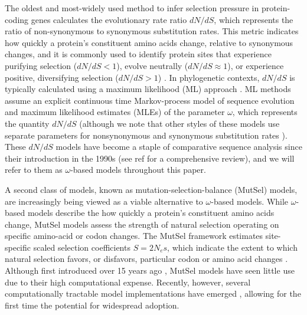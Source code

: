 \documentclass[11pt]{article}
\begin{document}
The oldest and most-widely used method to infer selection pressure in protein-coding genes calculates the evolutionary rate ratio $dN/dS$, which represents the ratio of non-synonymous to synonymous substitution rates. This metric indicates how quickly a protein's constituent amino acids change, relative to synonymous changes, and it is commonly used to identify protein sites that experience purifying selection ($dN/dS<1$), evolve neutrally ($dN/dS\approx1$), or experience positive, diversifying selection ($dN/dS>1$) \cite{NielsenYang1998, Yangetal2000, KosakovskyPondFrost2005b, Huelsenbecketal2006}. In phylogenetic contexts, $dN/dS$ is typically calculated using a maximum likelihood (ML) approach \cite{GoldmanYang1994,MuseGaut1994,NielsenYang1998,Yang2006}. ML methods assume an explicit continuous time Markov-process model of sequence evolution and maximum likelihood estimates (MLEs) of the parameter $\omega$, which represents the quantity $dN/dS$ (although we note that other styles of these models use separate parameters for nonsynonymous and synonymous substitution rates \cite{MuseGaut1994,KosakovskyPondMuse2005}). These $dN/dS$ models have become a staple of comparative sequence analysis since their introduction in the 1990s (see ref \cite{Anisimova2009} for a comprehensive review), and we will refer to them as $\omega$-based models throughout this paper.

A second class of models, known as mutation-selection-balance (MutSel) models, are increasingly being viewed as a viable alternative to $\omega$-based models. While $\omega$-based models describe the how quickly a protein's constituent amino acids change, MutSel models assess the strength of natural selection operating on specific amino-acid or codon changes. The MutSel framework estimates site-specific scaled selection coefficients $S=2N_es$, which indicate the extent to which natural selection favors, or disfavors, particular codon or amino acid changes \cite{HalpernBruno1998,YangNielsen2008,Rodrigueetal2010,Tamurietal2012}. Although first introduced over 15 years ago \cite{HalpernBruno1998}, MutSel models have seen little use due to their high computational expense. Recently, however, several computationally tractable model implementations have emerged \cite{RodrigueLartillot2014,Tamurietal2014}, allowing for the first time the potential for widespread adoption.		
		
\end{document}
